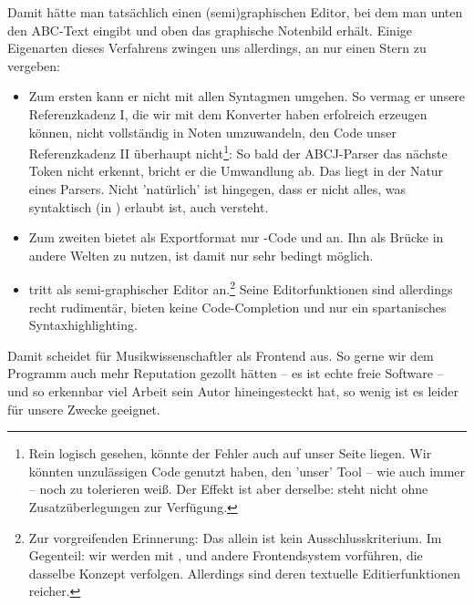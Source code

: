 Damit hätte man tatsächlich einen (semi)graphischen Editor, bei dem man unten
den ABC-Text eingibt und oben das graphische Notenbild erhält. Einige Eigenarten
dieses Verfahrens zwingen uns allerdings, an  nur einen Stern zu
vergeben:

\begin{itemize}
  \item Zum ersten kann er nicht mit allen Syntagmen umgehen. So vermag er
  unsere Referenzkadenz I, die wir mit dem Konverter  haben
  erfolreich erzeugen können, nicht vollständig in Noten umzuwandeln, den Code
  unser Referenzkadenz II überhaupt nicht\footnote{Rein logisch gesehen, könnte
  der Fehler auch auf unser Seite liegen. Wir könnten unzulässigen Code genutzt
  haben, den 'unser' Tool  -- wie auch immer -- noch zu tolerieren
  weiß. Der Effekt ist aber derselbe:  steht nicht ohne
  Zusatzüberlegungen zur Verfügung.}: So bald der ABCJ-Parser das nächste Token
  nicht erkennt, bricht er die Umwandlung ab. Das liegt in der Natur eines
  Parsers. Nicht 'natürlich' ist hingegen, dass er nicht alles, was syntaktisch
  (in ) erlaubt ist, auch versteht.
  \item Zum zweiten bietet  als Exportformat nur -Code und
   an. Ihn als Brücke in andere Welten zu nutzen, ist damit nur sehr
  bedingt möglich.
  \item {} tritt als semi-graphischer Editor an.\footnote{Zur
  vorgreifenden Erinnerung: Das allein ist kein Ausschlusskriterium. Im
  Gegenteil: wir werden mit ,  und 
  andere Frontendsystem vorführen, die dasselbe Konzept verfolgen. Allerdings
  sind deren textuelle Editierfunktionen reicher.} Seine Editorfunktionen sind
  allerdings recht rudimentär, bieten keine Code-Completion und nur ein
  spartanisches Syntaxhighlighting.
\end{itemize}

Damit scheidet  für Musikwissenschaftler als Frontend aus. So gerne
wir dem Programm auch mehr Reputation gezollt hätten -- es ist echte freie
Software -- und so erkennbar viel Arbeit sein Autor hineingesteckt hat, so wenig
ist es leider für unsere Zwecke geeignet.


%
